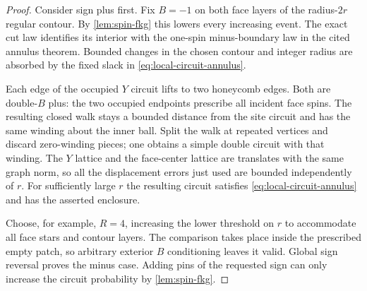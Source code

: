 \begin{proof}
Consider sign plus first.  Fix $B=-1$ on both face layers of the
radius-$2r$ regular contour.  By \cref{lem:spin-fkg} this lowers every
increasing event.  The exact cut law identifies its interior with the
one-spin minus-boundary law in the cited annulus theorem.  Bounded
changes in the chosen contour and integer radius are absorbed by the
fixed slack in \eqref{eq:local-circuit-annulus}.

Each edge of the occupied $Y$ circuit lifts to two honeycomb edges.
Both are double-$B$ plus: the two occupied endpoints prescribe all
incident face spins.  The resulting closed walk stays a bounded distance
from the site circuit and has the same winding about the inner ball.
Split the walk at repeated vertices and discard zero-winding pieces;
one obtains a simple double circuit with that winding.  The $Y$ lattice
and the face-center lattice are translates with the same graph norm, so
all the displacement errors just used are bounded independently of $r$.
For sufficiently large $r$ the resulting circuit satisfies
\eqref{eq:local-circuit-annulus} and has the asserted enclosure.

Choose, for example, $R=4$, increasing the lower threshold on $r$ to
accommodate all face stars and contour layers.  The comparison takes
place inside the prescribed empty patch, so arbitrary exterior $B$
conditioning leaves it valid.  Global sign reversal proves the minus
case.  Adding pins of the requested sign can only increase the circuit
probability by \cref{lem:spin-fkg}.
\end{proof}

